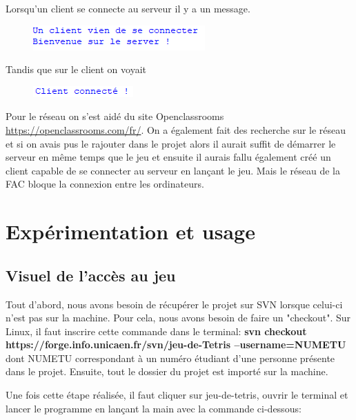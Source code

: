\documentclass[a4paper, 11pt]{article}
\begin{document}
            Lorsqu'un client se connecte au serveur il y a un message.
            
            \begin{figure}[ht]
                \centering
                \includegraphics[]{images/client_conecter.png}
            \end{figure}
            
            Tandis que sur le client on voyait

            \begin{figure}[ht]
                \centering
                \includegraphics[]{images/client.png}
            \end{figure}
            
            Pour le réseau on s'est aidé du site Openclassrooms \url{https://openclassrooms.com/fr/}. On a également fait des recherche sur le réseau et si on avais pus le rajouter dans le projet alors il aurait suffit de démarrer le serveur en même temps que le jeu et ensuite il aurais fallu également créé un client capable de se connecter au serveur en lançant le jeu. Mais le réseau de la FAC bloque la connexion entre les ordinateurs.
        
        
    \section{Expérimentation et usage}
        \subsection{Visuel de l'accès au jeu}
            Tout d'abord, nous avons besoin de récupérer le projet sur SVN lorsque celui-ci n'est pas sur la machine. Pour cela, nous avons besoin de faire un "checkout". Sur Linux, il faut inscrire cette commande dans le terminal: \textbf{svn checkout https://forge.info.unicaen.fr/svn/jeu-de-Tetris --username=NUMETU} dont NUMETU correspondant à un numéro étudiant d'une personne présente dans le projet. Ensuite, tout le dossier du projet est importé sur la machine.
            
            Une fois cette étape réalisée, il faut cliquer sur jeu-de-tetris, ouvrir le terminal et lancer le programme en lançant la main avec la commande ci-dessous:
            
\end{document}
